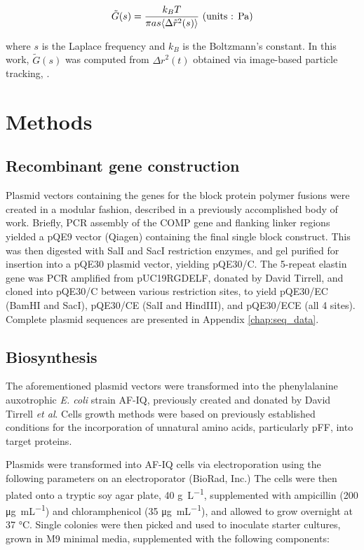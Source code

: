 \begin{refsection}
\begin{equation}
    \label{eq:stokes-einstein}
    \tilde{G}(s)=
    \frac{k_BT}{\pi a s \langle \Delta \tilde{r}^2(s) \rangle}
    \text{ (units : \si{\pascal})}
\end{equation}

where ${s}$ is the Laplace frequency and ${k_B}$ is the Boltzmann's constant. In
this work, ${\tilde{G}(s)}$ was computed from ${\Delta r^2(t)}$ obtained via
image-based particle tracking, .

\section{Methods}

\subsection{Recombinant gene construction}

Plasmid vectors containing the genes for the block protein polymer fusions were
created in a modular fashion, described in a previously accomplished body of
work.\cite{Haghpanah2009} Briefly, PCR assembly of the COMP gene and
flanking linker regions yielded a pQE9 vector (Qiagen) containing the final
single block construct. This was then digested with SalI and SacI restriction
enzymes, and gel purified for insertion into a pQE30 plasmid vector, yielding
pQE30/C. The 5-repeat elastin gene was PCR amplified from pUC19RGDELF, donated
by David Tirrell, and cloned into pQE30/C between various restriction sites, to
yield pQE30/EC (BamHI and SacI), pQE30/CE (SalI and HindIII), and pQE30/ECE (all
4 sites). Complete plasmid sequences are presented in Appendix
\ref{chap:seq_data}. 

\subsection{Biosynthesis}

The aforementioned plasmid vectors were transformed into the phenylalanine
auxotrophic \emph{E. coli} strain AF-IQ, previously created and donated by David
Tirrell \emph{et al}.\cite{Yoshikawa1994,Sharma2000} Cells growth methods were based on
previously established conditions for the incorporation of unnatural amino
acids, particularly pFF, into target
proteins.\cite{Voloshchuk2009,Yoshikawa1994}

Plasmids were transformed into AF-IQ cells via electroporation using the
following parameters on an electroporator (BioRad, Inc.) The cells were then
plated onto a tryptic soy agar plate, 40 \si{\g\per\L}, supplemented with
ampicillin (200 \si{\ug\per\mL}) and chloramphenicol (35 \si{\ug\per\mL}), and
allowed to grow overnight at 37 \si{\celsius}. Single colonies were then picked
and used to inoculate starter cultures, grown in M9 minimal media, supplemented
with the following components:


\end{refsection}
